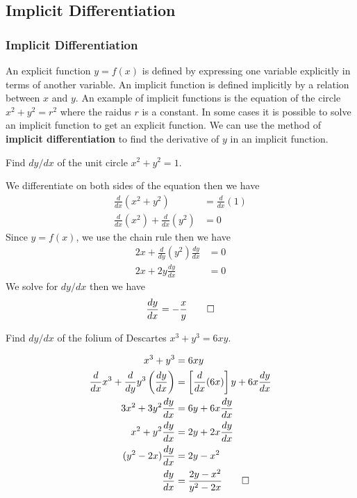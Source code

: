 \subsection{Implicit Differentiation}
\subsubsection{Implicit Differentiation}
An explicit function \(y=f(x)\) is defined by expressing one variable
explicitly in terms of another variable.
An implicit function is defined implicitly by a relation between \(x\) and
\(y\).
An example of implicit functions is the equation of the circle \(x^2+y^2=r^2\)
where the raidus \(r\) is a constant.
In some cases it is possible to solve an implicit function to get an explicit function.
We can use the method of \textbf{implicit differentiation} to find the derivative
of \(y\) in an implicit function.
\begin{problem}
    Find \(dy/dx\) of the unit circle \(x^2+y^2=1\).
\end{problem}
\begin{solution}
    We differentiate on both sides of the equation then we have
    \begin{align*}
        \frac{d}{dx}(x^2+y^2) &= \frac{d}{dx}(1) \\
        \frac{d}{dx}(x^2)+\frac{d}{dx}(y^2) &= 0
    \end{align*}
    Since \(y=f(x)\), we use the chain rule then we have
    \begin{align*}
        2x+\frac{d}{dy}(y^2)\frac{dy}{dx} &= 0 \\
        2x+2y\frac{dy}{dx} &= 0
    \end{align*}
    We solve for \(dy/dx\) then we have
    \[\frac{dy}{dx}=-\frac{x}{y}\qedhere\]
\end{solution}
\begin{problem}
    Find \(dy/dx\) of the folium of Descartes \(x^3+y^3=6xy\).
\end{problem}
\begin{solution}
    \begin{align*}
        x^3+y^3 &= 6xy \\
        \frac{d}{dx}x^3+\frac{d}{dy}y^3\left(\frac{dy}{dx}\right)
        &= \left[\frac{d}{dx}(6x)\right]y+6x\frac{dy}{dx} \\
        3x^2+3y^2\frac{dy}{dx} &= 6y+6x\frac{dy}{dx} \\
        x^2+y^2\frac{dy}{dx} &= 2y+2x\frac{dy}{dx} \\
        (y^2-2x)\frac{dy}{dx} &= 2y-x^2 \\
        \frac{dy}{dx} &= \frac{2y-x^2}{y^2-2x} \qedhere
    \end{align*}
\end{solution}
